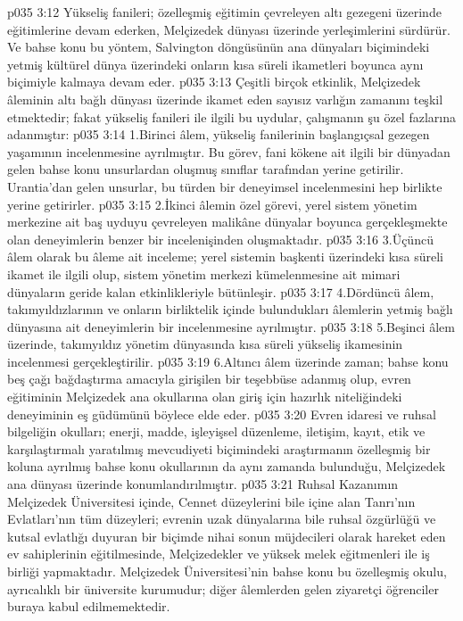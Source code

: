 \vs p035 3:12 Yükseliş fanileri; özelleşmiş eğitimin çevreleyen altı gezegeni üzerinde eğitimlerine devam ederken, Melçizedek dünyası üzerinde yerleşimlerini sürdürür. Ve bahse konu bu yöntem, Salvington döngüsünün ana dünyaları biçimindeki yetmiş kültürel dünya üzerindeki onların kısa süreli ikametleri boyunca aynı biçimiyle kalmaya devam eder.
\vs p035 3:13 Çeşitli birçok etkinlik, Melçizedek âleminin altı bağlı dünyası üzerinde ikamet eden sayısız varlığın zamanını teşkil etmektedir; fakat yükseliş fanileri ile ilgili bu uydular, çalışmanın şu özel fazlarına adanmıştır:
\vs p035 3:14 1.\bibnobreakspace Birinci âlem, yükseliş fanilerinin başlangıçsal gezegen yaşamının incelenmesine ayrılmıştır. Bu görev, fani kökene ait ilgili bir dünyadan gelen bahse konu unsurlardan oluşmuş sınıflar tarafından yerine getirilir. Urantia’dan gelen unsurlar, bu türden bir deneyimsel incelenmesini hep birlikte yerine getirirler.
\vs p035 3:15 2.\bibnobreakspace İkinci âlemin özel görevi, yerel sistem yönetim merkezine ait baş uyduyu çevreleyen malikâne dünyalar boyunca gerçekleşmekte olan deneyimlerin benzer bir incelenişinden oluşmaktadır.
\vs p035 3:16 3.\bibnobreakspace Üçüncü âlem olarak bu âleme ait inceleme; yerel sistemin başkenti üzerindeki kısa süreli ikamet ile ilgili olup, sistem yönetim merkezi kümelenmesine ait mimari dünyaların geride kalan etkinlikleriyle bütünleşir.
\vs p035 3:17 4.\bibnobreakspace Dördüncü âlem, takımyıldızlarının ve onların birliktelik içinde bulundukları âlemlerin yetmiş bağlı dünyasına ait deneyimlerin bir incelenmesine ayrılmıştır.
\vs p035 3:18 5.\bibnobreakspace Beşinci âlem üzerinde, takımyıldız yönetim dünyasında kısa süreli yükseliş ikamesinin incelenmesi gerçekleştirilir.
\vs p035 3:19 6.\bibnobreakspace Altıncı âlem üzerinde zaman; bahse konu beş çağı bağdaştırma amacıyla girişilen bir teşebbüse adanmış olup, evren eğitiminin Melçizedek ana okullarına olan giriş için hazırlık niteliğindeki deneyiminin eş güdümünü böylece elde eder.
\vs p035 3:20 Evren idaresi ve ruhsal bilgeliğin okulları; enerji, madde, işleyişsel düzenleme, iletişim, kayıt, etik ve karşılaştırmalı yaratılmış mevcudiyeti biçimindeki araştırmanın özelleşmiş bir koluna ayrılmış bahse konu okullarının da aynı zamanda bulunduğu, Melçizedek ana dünyası üzerinde konumlandırılmıştır.
\vs p035 3:21 Ruhsal Kazanımın Melçizedek Üniversitesi içinde, Cennet düzeylerini bile içine alan Tanrı’nın Evlatları’nın tüm düzeyleri; evrenin uzak dünyalarına bile ruhsal özgürlüğü ve kutsal evlatlığı duyuran bir biçimde nihai sonun müjdecileri olarak hareket eden ev sahiplerinin eğitilmesinde, Melçizedekler ve yüksek melek eğitmenleri ile iş birliği yapmaktadır. Melçizedek Üniversitesi’nin bahse konu bu özelleşmiş okulu, ayrıcalıklı bir üniversite kurumudur; diğer âlemlerden gelen ziyaretçi öğrenciler buraya kabul edilmemektedir.
